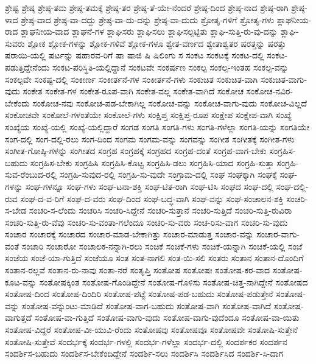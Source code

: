 {ಶ್ರೇಷ್ಟ
ಶ್ರೇಷ್ಠ
ಶ್ರೇಷ್ಠ-ತಮ
ಶ್ರೇಷ್ಠ-ತಮಕ್ಕೆ
ಶ್ರೇಷ್ಠ-ತರ
ಶ್ರೇಷ್ಠ-ತೆ-ಯೇ-ನೆಂದರೆ
ಶ್ರೇಷ್ಠ-ದಿಂದ
ಶ್ರೇಷ್ಠ-ನಾದ
ಶ್ರೇಷ್ಠ-ರಾಗಿ
ಶ್ರೇಷ್ಠ-ಳಾದ
ಶ್ರೇಷ್ಠ-ವಾದ
ಶ್ರೇಷ್ಠ-ವಾ-ದದ್ದು
ಶ್ರೇಷ್ಠ-ವಾ-ದು-ದನ್ನು
ಶ್ರೇಷ್ಠ-ವಾ-ದುದು
ಶ್ರೋತೃ-ಗಳಿಗೆ
ಶ್ರೋತೃ-ಗಳು
ಶ್ಲಾಘನೀಯ-ರಾದ
ಶ್ಲಾಘನೀಯ-ವಾದ
ಶ್ಲಾಘನೆ-ಗಳ
ಶ್ಲಾಘಿಸರು
ಶ್ಲಾಘಿಸಲು
ಶ್ಲಾಘಿಸಲ್ಪಟ್ಟಿತು
ಶ್ಲಾಘಿ-ಸುತ್ತಿ-ರು-ವು-ದನ್ನು
ಶ್ಲಾಘಿ-ಸುವರು
ಶ್ಲೋಕ
ಶ್ಲೋಕ-ಗಳನ್ನು
ಶ್ಲೋಕ-ಗಳಿವೆ
ಶ್ಲೋಕ-ಗಳೂ
ಶ್ವೇತ-ವರ್ಣದ
ಶ್ವೇತಾಶ್ವತರ
ಷರತ್ತನ್ನು
ಷರತ್ತು
ಷರಾಯಿ-ಯಲ್ಲಿ
ಷರ್ಟನ್ನು
ಷಹಾರವ-ರಿಗೆ
ಷಾ
ಷಾಜಿ
ಷಿ
ಷಿಲಿಂಗು
ಸ
ಸಂಕಟ
ಸಂಕಟಕ್ಕೆ
ಸಂಕಟ-ದಲ್ಲಿ
ಸಂಕಟ-ಪಡುತ್ತಿದ್ದೇನೆಂದು
ಸಂಕಟ-ಪರಿಸ್ಥಿತಿ-ಯಲ್ಲಿದ್ದಾನೆ
ಸಂಕಟವೇ
ಸಂಕರ್ಷಣ
ಸಂಕಲ್ಪ
ಸಂಕಲ್ಪ-ಇಂತಹ
ಸಂಕಲ್ಪ-ವನ್ನು
ಸಂಕಲ್ಪವೇ
ಸಂಕಷ್ಟ-ದಲ್ಲಿ
ಸಂಕೀರ್ಣ
ಸಂಕೀರ್ತನೆ-ಗಳ
ಸಂಕೀರ್ತನೆ-ಗಳು
ಸಂಕುಚಿತ
ಸಂಕುಚಿತ-ವಾಗಿ
ಸಂಕುಚಿತ-ವಾಗು-ವುದು
ಸಂಕೇತ
ಸಂಕೇತ-ಗಳ
ಸಂಕೇತ-ರೂಪ-ವಾಗಿ
ಸಂಕೇತ-ವಲ್ಲ
ಸಂಕೇತ-ವಾಗಿದೆ
ಸಂಕೋಚ
ಸಂಕೋಚ-ನವಿರ-ಬೇಕೆಂದು
ಸಂಕೋಚ-ನವು
ಸಂಕೋಚ-ಪಡ-ಬೇಕಾಗಿಲ್ಲ
ಸಂಕೋಚ-ವನ್ನು
ಸಂಕೋಚ-ವಾಗು-ವುದು
ಸಂಕೋಚ-ವಿಲ್ಲದೆ
ಸಂಕೋಚವೇ
ಸಂಕೋಲೆ-ಗಳಂತೆಯೇ
ಸಂಕೋಲೆ-ಗಳು
ಸಂಕ್ಷಿಪ್ತ
ಸಂಕ್ಷಿಪ್ತ-ರೂಪ
ಸಂಕ್ಷೇಪ
ಸಂಕ್ಷೇಪ-ವಾಗಿ
ಸಂಖ್ಯೆ
ಸಂಖ್ಯೆಯ
ಸಂಖ್ಯೆ-ಯಲ್ಲಿ
ಸಂಖ್ಯೆ-ಯಲ್ಲಿದ್ದಾರೆ
ಸಂಗಡ
ಸಂಗತಿ
ಸಂಗತಿ-ಗಳು
ಸಂಗತಿ-ಗಳೆಲ್ಲಾ
ಸಂಗತಿ-ಯನ್ನು
ಸಂಗತಿಯೇ
ಸಂಗ-ದಲ್ಲಿ
ಸಂಗ-ದಲ್ಲಿ-ರಲು
ಸಂಗ-ದಿಂದ
ಸಂಗಮ
ಸಂಗಮ-ವನ್ನು
ಸಂಗವನ್ನು
ಸಂಗೀತ
ಸಂಗೀತಕ್ಕೆ
ಸಂಗೀತ-ಗಳು
ಸಂಗೀತ-ಗೋಷ್ಠಿ-ಗಳನ್ನು
ಸಂಗೀತದ
ಸಂಗ್ರಹ
ಸಂಗ್ರಹಕ್ಕೆ
ಸಂಗ್ರಹದ
ಸಂಗ್ರಹ-ದಂತೆ
ಸಂಗ್ರಹ-ವಾಗ-ಬೇಕು
ಸಂಗ್ರಹಿಸ-ಬಹುದು
ಸಂಗ್ರಹಿಸ-ಬೇಕು
ಸಂಗ್ರಹಿಸಿ
ಸಂಗ್ರಹಿಸಿ-ಕೊಟ್ಟ
ಸಂಗ್ರಹಿಸಿ-ಡಲು
ಸಂಗ್ರಹಿಸಿ-ಯಾದ
ಸಂಗ್ರಹಿ-ಸುತ್ತಾ
ಸಂಗ್ರಹಿ-ಸುವ-ರೆಂಬುದ-ರಲ್ಲಿ
ಸಂಗ್ರಹಿ-ಸುವುದ-ರಲ್ಲಿ
ಸಂಗ್ರಹಿ-ಸು-ವುದೇ
ಸಂಗ್ರಾಮ-ದಲ್ಲಿ
ಸಂಘ
ಸಂಘಕ್ಕಾಗಿ
ಸಂಘಕ್ಕೆ
ಸಂಘ-ಗಳನ್ನು
ಸಂಘ-ಗಳನ್ನೂ
ಸಂಘ-ಗಳು
ಸಂಘ-ಟನಾ-ಶಕ್ತಿ
ಸಂಘ-ಟಿತ-ರಾಗಿ
ಸಂಘ-ಟಿಸಿ
ಸಂಘದ
ಸಂಘ-ದಲ್ಲಿ
ಸಂಘ-ದಲ್ಲಿ-ರುವ
ಸಂಘ-ದ-ವ-ರಿಗೆ
ಸಂಘ-ದ-ವರು
ಸಂಘ-ದಿಂದ
ಸಂಘ-ಬದ್ಧ-ವಾಗಿ
ಸಂಘ-ವನ್ನು
ಸಂಘ-ಸಂಚಾಲನ-ಶಕ್ತಿ
ಸಂಚರಿ-ಸ-ಬೇಡ
ಸಂಚರಿ-ಸ-ಲೆಂದು
ಸಂಚರಿಸಿ
ಸಂಚರಿ-ಸಿದ್ದೇನೆ
ಸಂಚರಿ-ಸುತ್ತಾನೆ
ಸಂಚರಿ-ಸುತ್ತಿದೆ
ಸಂಚರಿ-ಸುತ್ತಿ-ರುವಿರಾ
ಸಂಚರಿ-ಸುತ್ತಿ-ರು-ವೆವು
ಸಂಚರಿ-ಸು-ವಂತಾ-ಗಲೆಂದೂ
ಸಂಚರಿ-ಸು-ವರು
ಸಂಚ-ರಿಸು-ವಾಗ
ಸಂಚರಿ-ಸು-ವುದು
ಸಂಚಾರ
ಸಂಚಾರಕ್ಕೆ
ಸಂಚಾರದ
ಸಂಚಾರ-ಮಾಡ-ಬೇಕಾಗಿತ್ತು
ಸಂಚಾರ-ಮಾಡುತ್ತ
ಸಂಚಾರ-ವನ್ನು
ಸಂಚಾರ-ವಾಗು-ವಂತೆ
ಸಂಚಾರಿ
ಸಂಚಾರೋ
ಸಂಚಾಲಕ-ನನ್ನಾಗಿ-ರಲು
ಸಂಚಿಕೆ
ಸಂಚಿಕೆ-ಗಳು
ಸಂಚಿಕೆ-ಯನ್ನಾಗಿ
ಸಂಚಿಕೆ-ಯಲ್ಲಿ
ಸಂಜೆ
ಸಂಜೆಯ
ಸಂಜೆ-ಯಾ-ಗುತ್ತಿದೆ
ಸಂಜೆಯೂ
ಸಂತ
ಸಂತ-ನಾಗಲಿ
ಸಂತ-ಯಿ-ಸಲಿ
ಸಂತರು
ಸಂತಾನ
ಸಂತಾನ-ದೊಂದಿಗೆ
ಸಂತಾನ-ರಲ್ಲವೆ
ಸಂತಾನ-ರು-ನಾವು
ಸಂತಾ-ನರೆ
ಸಂತೃಪ್ತಿ
ಸಂತೋಷ
ಸಂತೋಷಃ
ಸಂತೋಷ-ಕರ-ವಾದ
ಸಂತೋಷ-ಕೂಟ-ವನ್ನು
ಸಂತೋಷಕ್ಕಿಂತ
ಸಂತೋಷ-ಗೊಂಡಿದ್ದೇನೆ
ಸಂತೋಷ-ಗೊಳಿಸು
ಸಂತೋಷ-ಚಿತ್ತ-ನಾಗಿದ್ದೇನೆ
ಸಂತೋಷದ
ಸಂತೋಷ-ದಿಂದ
ಸಂತೋಷ-ದಿಂದಿರಿ
ಸಂತೋಷ-ಪಟ್ಟೆ
ಸಂತೋಷ-ಪಡ-ಬಹುದು
ಸಂತೋಷ-ಪಡುತ್ತೇನೆ
ಸಂತೋಷ-ವನ್ನು
ಸಂತೋಷ-ವನ್ನುಂಟು-ಮಾಡಿದೆ
ಸಂತೋಷ-ವಾಗ-ಬಹುದು
ಸಂತೋಷ-ವಾಗಿ
ಸಂತೋಷ-ವಾಗಿದೆ
ಸಂತೋಷ-ವಾಗುತ್ತದೆ
ಸಂತೋಷ-ವಾ-ಗುತ್ತಿದೆ
ಸಂತೋಷ-ವಾಗು-ವುದು
ಸಂತೋಷ-ವಾಗು-ವುದೆಂದೂ
ಸಂತೋಷ-ವಾ-ಯಿತು
ಸಂತೋಷ-ವಿದ್ದರೆ
ಸಂತೋಷ-ವೀ-ಯುವಿ-ರೆಂದು
ಸಂತೋಷವು
ಸಂತೋಷವೂ
ಸಂತೋಷವೇ
ಸಂತೋಷಿ-ಸುತ್ತೇನೆ
ಸಂತೋಷಿ-ಸುತ್ತೇವೆ
ಸಂದರ್ಭಕ್ಕೆ
ಸಂದರ್ಭ-ಗಳಲ್ಲಿ
ಸಂದರ್ಭ-ಗಳೆಲ್ಲಾ
ಸಂದರ್ಭ-ದಲ್ಲಿ
ಸಂದರ್ಶಕರ
ಸಂದರ್ಶನ
ಸಂದರ್ಶಿಸ-ಬಹುದು
ಸಂದರ್ಶಿಸ-ಬೇಕೆಂದಿದ್ದೇನೆ
ಸಂದರ್ಶಿ-ಸಲು
ಸಂದರ್ಶಿಸಿ
ಸಂದರ್ಶಿಸಿದ
ಸಂದರ್ಶಿ-ಸಿ-ದಾಗ
}
